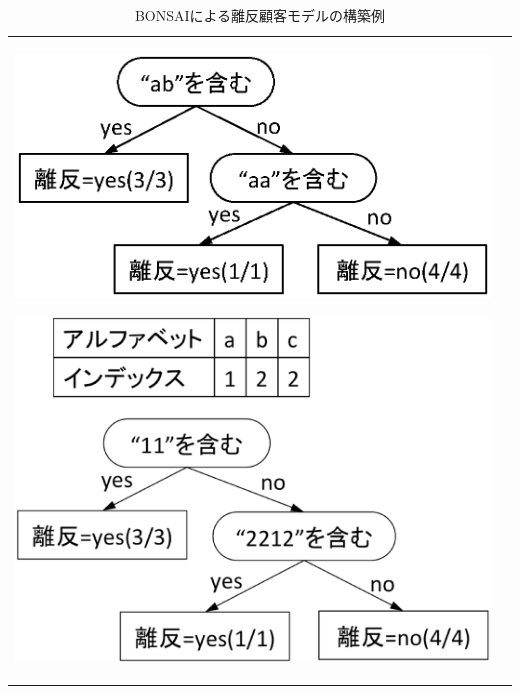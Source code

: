 \begin{table}[htbp]
\begin{center}
\begin{tabular}{ll}

\begin{minipage}{0.5\hsize}
\begin{center}
\centering
\includegraphics[scale=0.5,clip]{./figure/bonsai1.eps}
\caption{BONSAIによる離反顧客モデルの構築例}
\label{fig:mbonsai_bonsai1}
\end{center}
\end{minipage}

\begin{minipage}{0.5\hsize}
\begin{center}
\centering
\includegraphics[scale=0.19,clip]{./figure/bonsai2.eps}
\caption{BONSAIによる離反顧客モデルの構築例}
\label{fig:mbonsai_bonsai2}
\end{center}
\end{minipage}

\end{tabular} 
\end{center}
\end{table} 

